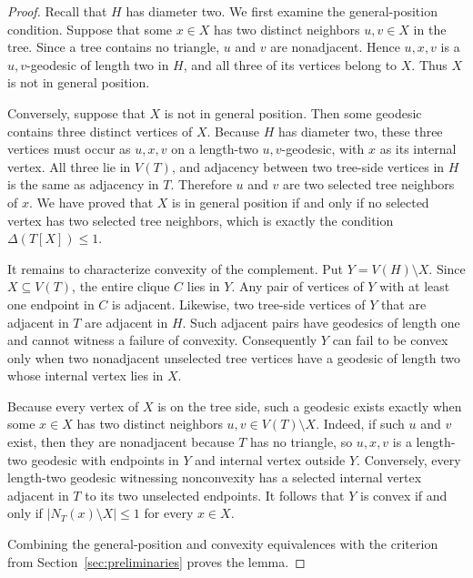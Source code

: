 \documentclass[11pt,a4paper]{article}
\numberwithin{equation}{section}
\begin{document}
\begin{proof}
Recall that \(H\) has diameter two. We first examine the
general-position condition. Suppose that some \(x\in X\) has two
distinct neighbors \(u,v\in X\) in the tree. Since a tree contains no
triangle, \(u\) and \(v\) are nonadjacent. Hence \(u,x,v\) is a
\(u,v\)-geodesic of length two in \(H\), and all three of its vertices
belong to \(X\). Thus \(X\) is not in general position.

Conversely, suppose that \(X\) is not in general position. Then some
geodesic contains three distinct vertices of \(X\). Because \(H\) has
diameter two, these three vertices must occur as \(u,x,v\) on a
length-two \(u,v\)-geodesic, with \(x\) as its internal vertex. All
three lie in \(V(T)\), and adjacency between two tree-side vertices in
\(H\) is the same as adjacency in \(T\). Therefore \(u\) and \(v\) are
two selected tree neighbors of \(x\). We have proved that \(X\) is in
general position if and only if no selected vertex has two selected tree
neighbors, which is exactly the condition \(\Delta(T[X])\le 1\).

It remains to characterize convexity of the complement. Put
\(Y=V(H)\setminus X\). Since \(X\subseteq V(T)\), the entire clique
\(C\) lies in \(Y\). Any pair of vertices of \(Y\) with at least one
endpoint in \(C\) is adjacent. Likewise, two tree-side vertices of \(Y\)
that are adjacent in \(T\) are adjacent in \(H\). Such adjacent pairs
have geodesics of length one and cannot witness a failure of convexity.
Consequently \(Y\) can fail to be convex only when two nonadjacent
unselected tree vertices have a geodesic of length two whose internal
vertex lies in \(X\).

Because every vertex of \(X\) is on the tree side, such a geodesic
exists exactly when some \(x\in X\) has two distinct neighbors
\(u,v\in V(T)\setminus X\). Indeed, if such \(u\) and \(v\) exist, then
they are nonadjacent because \(T\) has no triangle, so \(u,x,v\) is a
length-two geodesic with endpoints in \(Y\) and internal vertex outside
\(Y\). Conversely, every length-two geodesic witnessing nonconvexity has
a selected internal vertex adjacent in \(T\) to its two unselected
endpoints. It follows that \(Y\) is convex if and only if
\(|N_T(x)\setminus X|\le 1\) for every \(x\in X\).

Combining the general-position and convexity equivalences with the
criterion from Section~\ref{sec:preliminaries} proves the lemma.
\end{proof}
\end{document}
